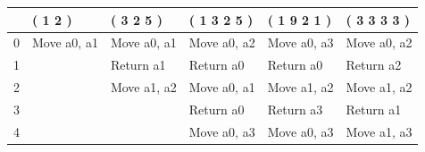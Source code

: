 \documentclass[12pt]{diazessay}
\newcounter{subsubsubsection}[subsubsection]
\begin{document}
\begin{tabular}{llllll}
\toprule
{} &      ( 1 2 ) &    ( 3 2 5 ) &  ( 1 3 2 5 ) &  ( 1 9 2 1 ) &  ( 3 3 3 3 ) \\
\midrule
0  &  Move a0, a1 &  Move a0, a1 &  Move a0, a2 &  Move a0, a3 &  Move a0, a2 \\
1  &              &    Return a1 &    Return a0 &    Return a0 &    Return a2 \\
2  &              &  Move a1, a2 &  Move a0, a1 &  Move a1, a2 &  Move a1, a2 \\
3  &              &              &    Return a0 &    Return a3 &    Return a1 \\
4  &              &              &  Move a0, a3 &  Move a0, a3 &  Move a1, a3 \\
\bottomrule
\end{tabular}
\end{document}
